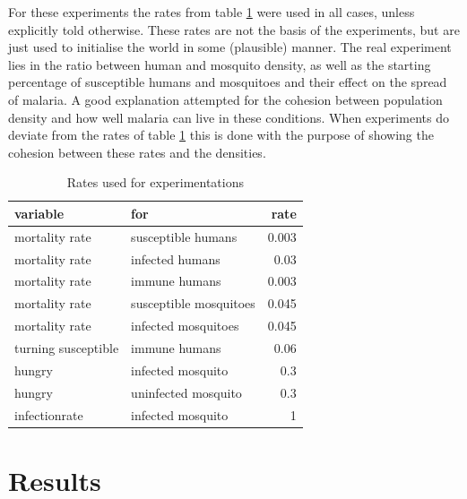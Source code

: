 \documentclass[a4paper]{report}
\begin{document}
For these experiments the rates from table \ref{tab:rates} were used in all
cases, unless explicitly told otherwise. These rates are not the basis of the
experiments, but are just used to initialise the world in some (plausible) manner.
The real experiment lies in the ratio between human and mosquito density, as
well as the starting percentage of susceptible humans and mosquitoes and their
effect on the spread of malaria. A good
explanation attempted for the cohesion between population density
and how well malaria can live in these conditions.  When experiments do
deviate from the rates of table \ref{tab:rates} this is done with the purpose of
showing the cohesion between these rates and the densities.

\begin{table}
\centering
\begin{tabular}{|l|l|r|}
        \hline
        variable&for&rate\\
        \hline
        mortality rate&susceptible humans &0.003\\
        mortality rate&infected humans&0.03\\
        mortality rate&immune humans&0.003\\
        mortality rate&susceptible mosquitoes&0.045\\
        mortality rate&infected mosquitoes&0.045\\
        turning susceptible&immune humans& 0.06\\
        hungry&infected mosquito  & 0.3\\
        hungry&uninfected mosquito& 0.3\\
        infectionrate&infected mosquito& 1\\
        \hline
\end{tabular}
\caption{Rates used for experimentations }
\label{tab:rates}
\end{table}

\section{Results}
\end{document}
